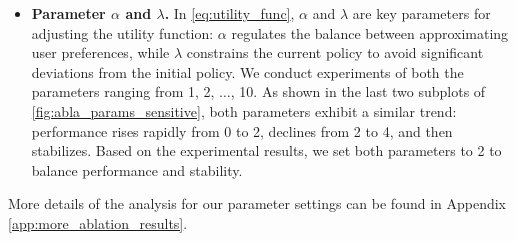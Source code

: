 \begin{itemize}[leftmargin=*]
\vspace{-1ex}
\item \textbf{Parameter $\alpha$ and $\lambda$.} 
In \autoref{eq:utility_func}, $\alpha$ and $\lambda$ are key parameters for adjusting the utility function: $\alpha$ regulates the balance between approximating user preferences, while $\lambda$ constrains the current policy to avoid significant deviations from the initial policy. We conduct experiments of both the parameters ranging from 1, 2, $\dots$, 10. As shown in the last two subplots of \autoref{fig:abla_params_sensitive}, both parameters exhibit a similar trend: performance rises rapidly from 0 to 2, declines from 2 to 4, and then stabilizes. 
Based on the experimental results, we set both parameters to 2 to balance performance and stability.
\vspace{-1ex}
\end{itemize}

More details of the analysis for our parameter settings can be found in Appendix \ref{app:more_ablation_results}.

